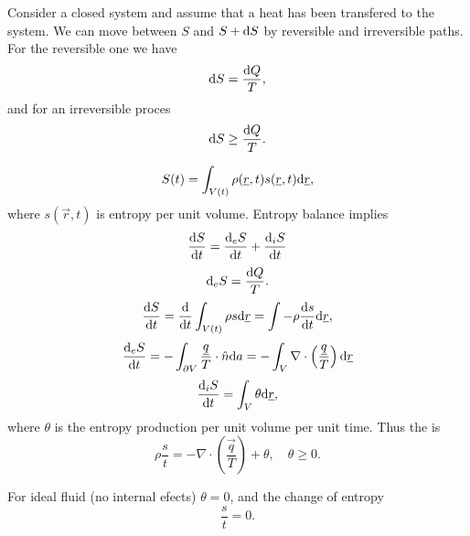 \documentclass[../main.tex]{subfiles}
\begin{document}
    Consider a closed system and assume that a heat has been transfered to the system.
    We can move between $S$ and $S + \mathrm{d} S$ by reversible and irreversible paths.
    For the reversible one we have 
    \begin{displaymath}
      \mathrm{d} S  = \frac{\mathrm{d} Q}{T},
    \end{displaymath}
    and for an irreversible proces
    \begin{displaymath}
      \mathrm{d} S \geq \frac{\mathrm{d} Q}{T}.
    \end{displaymath}
    
    \begin{displaymath}
      S(t) = \int_{V(t)} \rho( \underline{r} , t) s( \underline{r}, t) \mathrm{d} \underline{r},
    \end{displaymath}
    where $s(\vec r, t)$ is entropy per unit volume.
    Entropy balance implies
    \begin{displaymath}
      \frac{\mathrm{d} S}{\mathrm{d} t} = \frac{\mathrm{d}_e S}{\mathrm{d} t} + \frac{\mathrm{d}_i S}{\mathrm{d} t} 
    \end{displaymath}
    \begin{displaymath}
      \mathrm{d}_e S = \frac{\mathrm{d} Q}{T}.
    \end{displaymath}
    \begin{displaymath}
      \frac{\mathrm{d} S}{\mathrm{d} t} = \frac{\mathrm{d} }{\mathrm{d} t} \int_{V(t)} \rho s \mathrm{d} \underline{r} = \int-\rho \frac{\mathrm{d} s}{\mathrm{d} t} \mathrm{d} \underline{r},
    \end{displaymath}
    \begin{displaymath}
      \frac{\mathrm{d} _e S}{\mathrm{d} t} = - \int_{\partial V} \frac{ \underline{q}}{T} \cdot \hat n \mathrm{d} a 
      = - \int_V \nabla \cdot \left( \frac{\underline{q}}{T} \right) \mathrm{d} \underline{r}
    \end{displaymath}
    \begin{displaymath}
      \frac{\mathrm{d} _i S}{\mathrm{d} t} = \int_V \theta \mathrm{d} \underline{r},
    \end{displaymath}
    where $\theta$ is the entropy production per unit volume per unit time.
    Thus the  is
    \begin{displaymath}
      \rho \dfrac{s}{t} = - \nabla \cdot \left( \frac{\vec q }{T}  \right) + \theta, \quad \theta \geq 0.
    \end{displaymath}

    For ideal fluid (no internal efects) $\theta = 0$, and the change of entropy
    \begin{displaymath}
      \dfrac{s}{t} = 0.
    \end{displaymath}
\end{document}
